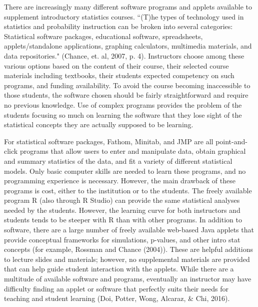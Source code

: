 \documentclass[11pt]{book}
\begin{document}
There are increasingly many different software programs and applets available to supplement introductory statistics courses. ``(T)he types of technology used in statistics and probability instruction can be broken into several categories: Statistical software packages, educational software, spreadsheets, applets/standalone applications, graphing calculators, multimedia materials, and data repositories." (Chance, et. al, 2007, p. 4). Instructors choose among these various options based on the content of their course, their selected course materials including textbooks, their students expected competency on such programs, and funding availability. To avoid the course becoming inaccessible to those students, the software chosen should be fairly straightforward and require no previous knowledge. Use of complex programs provides the problem of the students focusing so much on learning the software that they lose sight of the statistical concepts they are actually supposed to be learning. 

For statistical software packages, Fathom, Minitab, and JMP are all point-and-click programs that allow users to enter and manipulate data, obtain graphical and summary statistics of the data, and fit a variety of different statistical models. Only basic computer skills are needed to learn these programs, and no programming experience is necessary. However, the main drawback of these programs is cost, either to the institution or to the students. The freely available program R (also through R Studio) can provide the same statistical analyses needed by the students. However, the learning curve for both instructors and students tends to be steeper with R than with other programs. In addition to software, there are a large number of freely available web-based Java applets that provide conceptual frameworks for simulations, p-values, and other intro stat concepts (for example, Rossman and Chance (2004)). These are helpful additions to lecture slides and materials; however, no supplemental materials are provided that can help guide student interaction with the applets. While there are a multitude of available software and programs, eventually an instructor may have difficulty finding an applet or software that perfectly suits their needs for teaching and student learning (Doi, Potter, Wong, Alcaraz, \& Chi, 2016).  
\end{document}
